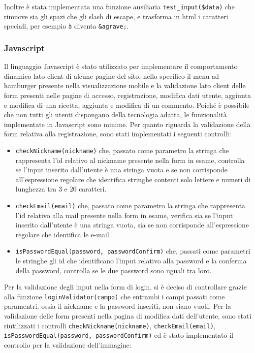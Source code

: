 Inoltre è stata implementata una funzione ausiliaria \texttt{test\_input(\$data)} che rimuove sia gli spazi che gli slash di escape, e trasforma in html i caratteri speciali, per esempio \texttt{à} diventa \texttt{\&agrave;}.

\subsubsection{Javascript}\label{subs:javascript}
Il linguaggio Javascript è stato utilizzato per implementare il comportamento dinamico lato client di alcune pagine del sito, nello specifico il menu ad hamburger presente nella visualizzazione mobile e la validazione lato client delle form presenti nelle pagine di accesso, registrazione, modifica dati utente, aggiunta e modifica di una ricetta, aggiunta e modifica di un commento.
Poiché è possibile che non tutti gli utenti dispongano della tecnologia adatta, le funzionalità implementate in Javascript sono minime. \newline
Per quanto riguarda la validazione della form relativa alla registrazione, sono stati implementati i seguenti controlli:
\begin{itemize}
	\item \texttt{checkNickname(nickname)} che, passato come parametro la stringa che rappresenta l'id relativo al nickname presente nella form in esame, controlla se l'input inserito dall'utente è una stringa vuota e se non corrisponde all'espressione regolare che identifica stringhe contenti solo lettere e numeri di lunghezza tra 3 e 20 caratteri.
	\item \texttt{checkEmail(email)} che, passato come parametro la stringa che rappresenta l'id relativo alla mail presente nella form in esame, verifica sia se l'input inserito dall'utente è una stringa vuota, sia se non corrisponde all'espressione regolare che identifica le e-mail.
	\item \texttt{isPasswordEqual(password, passwordConfirm)} che, passati come parametri le stringhe gli id che identificano l'input relativo alla password e la conferma della password, controlla se le due password sono uguali tra loro.
\end{itemize}
Per la validazione degli input nella form di login, si è deciso di controllare grazie alla funzione \texttt{loginValidator(campo)} che entrambi i campi passati come paramentri, ossia il nickname e la password inseriti, non siano vuoti. \newline
Per la validazione delle form presenti nella pagina di modifica dati dell'utente, sono stati riutilizzati i controlli \texttt{checkNickname(nickname)}, \texttt{checkEmail(email)}, \texttt{isPasswordEqual(password, passwordConfirm)} ed è stato implementato il controllo per la validazione dell'immagine:
